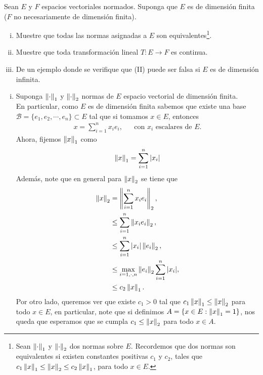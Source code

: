 \begin{homeworkProblem}
  Sean $E$ y $F$ espacios vectoriales normados. Suponga que $E$ es de dimensión finita ($F$ no necesariamente de dimensión finita).
  \begin{enumerate}[(i)]
    \item Muestre que todas las normas asignadas a $E$ son equivalentes\footnote{Sean $\left\|\cdot\right\|_{1}$ y $\left\|\cdot\right\|_{2}$ dos normas sobre $E$. Recordemos que dos normas son equivalentes si existen constantes positivas $c_1$ y $c_2$, tales que $c_1\left\|x\right\|_{1}\leq \left\|x\right\|_{2}\leq c_2\left\|x\right\|_{1}$, para todo $x\in E$.}.
    \item Muestre que toda transformación lineal $T:E\to F$ es continua.
    \item De un ejemplo donde se verifique que (II) puede ser falsa si $E$ es de dimensión infinita. 
  \end{enumerate}
  \begin{solution}
    \begin{enumerate}[(i)]
      \item Suponga $\left\|\cdot\right\|_{1}$ y $\left\|\cdot\right\|_{2}$ normas de $E$ espacio vectorial de dimensión finita.\\
        En particular, como $E$ es de dimensión finita sabemos que existe una base\\
        $\mathcal{B}=\{e_1,e_2,\cdots,e_n\}\subset E$ tal que si tomamos $x\in E$, entonces
        \begin{align*}
          x=\sum_{i=1}^{n}x_ie_i, &&\text{con $x_i$ escalares de $E$.}
        \end{align*}
        Ahora, fijemos $\left\|x\right\|_1$ como 
        \begin{align*}
          \left\|x\right\|_{1}=\sum_{i=1}^{n}|x_i|
        \end{align*}
        Además, note que en general para $\left\|x\right\|_2$ se tiene que
        \begin{align*}
          \left\|x\right\|_{2}&=\left\|\sum_{i=1}^{n}x_ie_i\right\|_{2},\\
          &\leq \sum_{i=1}^{n}\left\|x_ie_{i}\right\|_{2},\\
          &\leq \sum_{i=1}^{n}|x_i|\left\|e_i\right\|_{2},\\
          &\leq \max_{i=1,\cdot,n}\left\|e_i\right\|_{2}\sum_{i=1}^{n}|x_i|,\\
          &\leq c_{2}\left\|x\right\|_{1}.
        \end{align*}
        Por otro lado, queremos ver que existe $c_1>0$ tal que $c_1\left\|x\right\|_{1}\leq \left\|x\right\|_{2}$ para todo $x\in E$, en particular, note que si definimos $A=\{x\in E: \left\|x\right\|_{1}=1\}$, nos queda que esperamos que se cumpla $c_1\leq \left\|x\right\|_{2}$ para todo $x\in A$.\\

\end{enumerate}
\end{solution}
\end{homeworkProblem}
